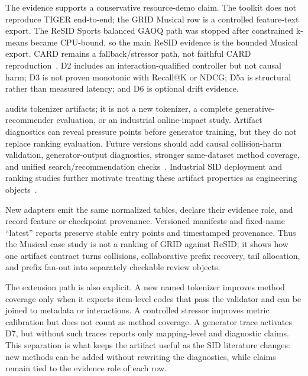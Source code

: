 The evidence supports a conservative resource-demo claim. The toolkit does not
reproduce TIGER end-to-end; the GRID Musical row is a controlled feature-text
export. The ReSID Sports balanced GAOQ path was stopped after constrained
k-means became CPU-bound, so the main ReSID evidence is the bounded Musical
export. CARD remains a fallback/stressor path, not faithful CARD
reproduction~\cite{wei2026card}. D2 includes an interaction-qualified
controller but not causal harm; D3 is not proven monotonic with Recall@K or
NDCG; D5a is structural rather than measured latency; and D6 is optional drift
evidence.

\tool audits tokenizer artifacts; it is not a new \sid tokenizer, a complete
generative-recommender evaluation, or an industrial online-impact study.
Artifact diagnostics can reveal pressure points before generator training, but
they do not replace ranking evaluation. Future versions should add causal
collision-harm validation, generator-output diagnostics, stronger same-dataset
method coverage, and unified search/recommendation checks~\cite{li2024survey,penha2025jointsid}.
Industrial SID deployment and ranking studies further motivate treating these
artifact properties as engineering objects~\cite{singh2023bettersemanticids,li2026sidcoord,ju2026snapchatsid}.

New adapters emit the same normalized tables, declare their evidence role, and
record feature or checkpoint provenance. Versioned manifests and fixed-name
``latest'' reports preserve stable entry points and timestamped provenance.
Thus the Musical case study is not a ranking of GRID against ReSID; it shows
how one artifact contract turns collisions, collaborative prefix recovery, tail
allocation, and prefix fan-out into separately checkable review objects.

The extension path is also explicit. A new named tokenizer improves method
coverage only when it exports item-level codes that pass the validator and can
be joined to metadata or interactions. A controlled stressor improves metric
calibration but does not count as method coverage. A generator trace activates
D7, but without such traces \tool reports only mapping-level and diagnostic
claims. This separation is what keeps the artifact useful as the SID literature
changes: new methods can be added without rewriting the diagnostics, while
claims remain tied to the evidence role of each row.
